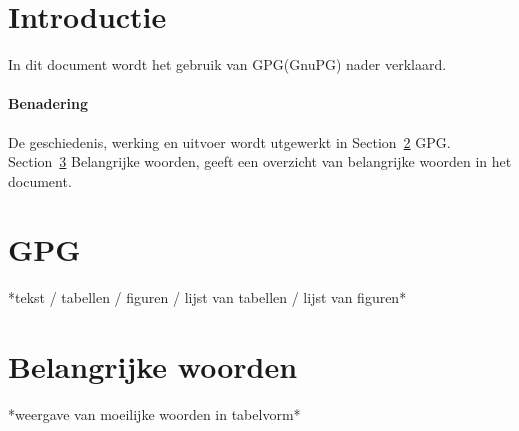 \documentclass[12pt]{article}
\begin{document}
\maketitle
\newpage
\tableofcontents
\newpage

\section{Introductie}
In dit document wordt het gebruik van GPG(GnuPG) nader verklaard.


\paragraph{Benadering}
De geschiedenis, werking en uitvoer wordt utgewerkt in Section~\ref{GPG} GPG.\\
Section~\ref{Belangrijke woorden} Belangrijke woorden, geeft een overzicht van belangrijke woorden in het document.

\section{GPG}\label{GPG}
*tekst / tabellen / figuren / lijst van tabellen / lijst van figuren*

\section{Belangrijke woorden}\label{Belangrijke woorden}
*weergave van moeilijke woorden in tabelvorm*



\end{document}
